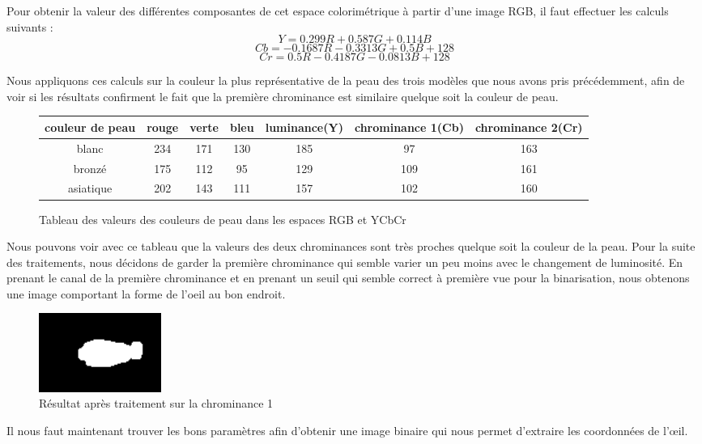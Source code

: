 Pour obtenir la valeur des différentes composantes de cet espace colorimétrique à partir
d'une image RGB, il faut effectuer les calculs suivants :
$$Y = 0.299R + 0.587 G + 0.114 B$$
$$Cb = -0.1687R - 0.3313 G + 0.5B + 128$$
$$Cr = 0.5R -0.4187G -0.0813B + 128$$

Nous appliquons ces calculs sur la couleur la plus représentative de la peau des trois modèles
que nous avons pris précédemment, afin de voir si les résultats confirment le fait que la première
chrominance est similaire quelque soit la couleur de peau.

\begin{figure}[H]
 \begin{tabular}{|c|c|c|c|c|c|c|}
  \hline
  couleur de peau & rouge & verte & bleu & luminance(Y) & chrominance 1(Cb) & chrominance 2(Cr)\\
  \hline
  blanc & 234 & 171 & 130 & 185 & 97 & 163 \\
  \hline
  bronzé & 175 & 112 & 95 & 129 & 109 & 161 \\
  \hline
  asiatique & 202 & 143 & 111 & 157 & 102 & 160\\
  \hline
 \end{tabular}
 \caption{Tableau des valeurs des couleurs de peau dans les espaces RGB et YCbCr}
\end{figure}

Nous pouvons voir avec ce tableau que la valeurs des deux chrominances sont très proches quelque soit
la couleur de la peau. Pour la suite des traitements, nous décidons de garder la première chrominance qui semble
varier un peu moins avec le changement de luminosité. En prenant le canal de la première chrominance et en 
prenant un seuil qui semble correct à première vue pour la binarisation, nous obtenons une image comportant la forme de l'oeil au bon endroit.

\begin{figure}[H]
 \center
 \includegraphics[width=4cm]{image/result_yuv.png}
 \caption{Résultat après traitement sur la chrominance 1}
\end{figure}

Il nous faut maintenant trouver les bons paramètres afin d'obtenir une image binaire qui nous permet d'extraire les 
coordonnées de l'œil.

